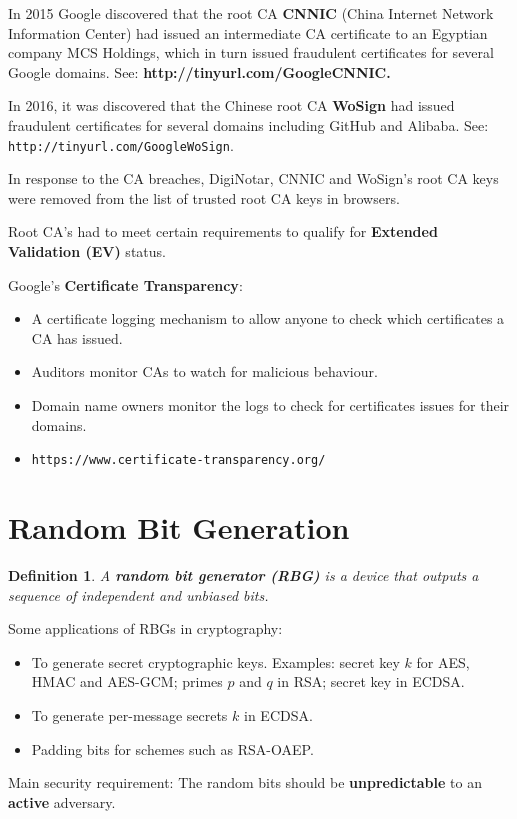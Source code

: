 \documentclass[12pt,titlepage]{article}
\newtheorem{protodefinition}[prototheorem]{Definition}
\newenvironment{definition}
{\colorlet{shadecolor}{cyan!15}\begin{shaded}\begin{protodefinition}\normalfont}{\end{protodefinition}\end{shaded}}
\let\stdsection\section
\renewcommand\section{\clearpage\stdsection}
\begin{document}
In 2015 Google discovered that the root CA \textbf{CNNIC} (China Internet Network Information Center) had issued an intermediate CA certificate to an Egyptian company MCS Holdings, which in turn issued fraudulent certificates for several Google domains. See: \textbf{http://tinyurl.com/GoogleCNNIC.}

In 2016, it was discovered that the Chinese root CA \textbf{WoSign} had issued fraudulent certificates for several domains including GitHub and Alibaba. See: \texttt{http://tinyurl.com/GoogleWoSign}.

In response to the CA breaches, DigiNotar, CNNIC and WoSign’s root CA keys were removed from the list of trusted root CA keys in browsers.

Root CA’s had to meet certain requirements to qualify for \textbf{Extended Validation (EV)} status.

Google’s \textbf{Certificate Transparency}:\begin{itemize}
	\item A certificate logging mechanism to allow anyone to check which certificates a CA has issued. 
	\item Auditors monitor CAs to watch for malicious behaviour. 
	\item Domain name owners monitor the logs to check for certificates issues for their domains.
	\item \texttt{https://www.certificate-transparency.org/}
\end{itemize}

\section{Random Bit Generation}
\begin{definition}
	A \textbf{random bit generator (RBG)} is a device that outputs a sequence of independent and unbiased bits.
\end{definition}
Some applications of RBGs in cryptography:\begin{itemize}
	\item To generate secret cryptographic keys. Examples: secret key $k$ for AES, HMAC and AES-GCM; primes $p$ and $q$ in RSA; secret key in ECDSA.
	\item To generate per-message secrets $k$ in ECDSA.
	\item Padding bits for schemes such as RSA-OAEP.
\end{itemize}

Main security requirement: The random bits should be \textbf{unpredictable} to an \textbf{active} adversary.
\end{document}
